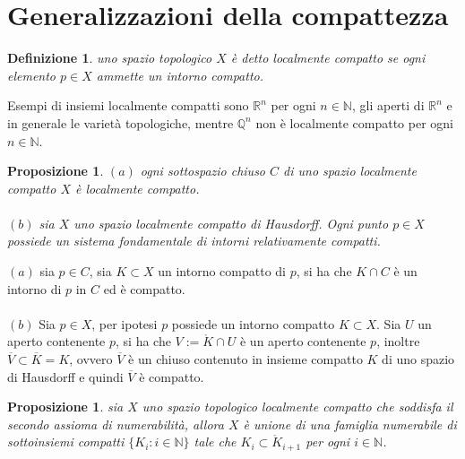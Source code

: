 \documentclass[oneside, 11pt]{amsbook}
\makeatletter
\newcommand{\0}{{(0)}}
\newcommand{\3}{{(3)}}
\theoremstyle{colonplain}
\newtheorem{prop}[thm]{Proposizione}
\theoremstyle{colondefinition}
\newtheorem{defn}[thm]{Definizione}
\theoremstyle{colonremark}
\numberwithin{equation}{chapter}
\renewcommand{\proofname}{Dimostrazione}
\renewenvironment{proof}[1][\proofname]{\par
  \pushQED{\qed}%
  \normalfont \topsep6\p@\@plus6\p@\relax
  \trivlist
  \item[\hskip\labelsep\bfseries #1:]\ignorespaces
}{%
  \popQED\endtrivlist\@endpefalse
}
\makeatother
\begin{document}
\section{Generalizzazioni della compattezza}
\begin{defn}
uno spazio topologico $X$ è detto \textit{localmente compatto} se ogni elemento $p \in X$ ammette un intorno compatto.
\end{defn}
Esempi di insiemi localmente compatti sono $\mathbb{R}^n$ per ogni $n \in \mathbb{N}$, gli aperti di $\mathbb{R}^n$ e in generale le varietà topologiche, mentre $\mathbb{Q}^n$ non è localmente compatto per ogni $n \in \mathbb{N}$.
\begin{prop}
$(a)$ ogni sottospazio chiuso $C$ di uno spazio localmente compatto $X$ è localmente compatto. \\ \\
$(b)$ sia $X$ uno spazio localmente compatto di Hausdorff. Ogni punto $p \in X$ possiede un sistema fondamentale di intorni relativamente compatti.
\end{prop}
\begin{proof}
$(a)$ sia $p \in C$, sia $K \subset X$ un intorno compatto di $p$, si ha che $K \cap C$ è un intorno di $p$ in $C$ ed è compatto. \\ \\
$(b)$ Sia $p \in X$, per ipotesi $p$ possiede un intorno compatto $K \subset X$. Sia $U$ un aperto contenente $p$, si ha che $V := \mathring{K} \cap U$ è un aperto contenente $p$, inoltre $\overline{V} \subset \overline{K} = K$, ovvero $\overline{V}$ è un chiuso contenuto in insieme compatto $K$ di uno spazio di Hausdorff e quindi $\overline{V}$ è compatto.
\end{proof}
\begin{prop}\label{ExhaustionCompacts}
sia $X$ uno spazio topologico localmente compatto che soddisfa il secondo assioma di numerabilità, allora $X$ è unione di una famiglia numerabile di sottoinsiemi compatti $\{K_i : i \in \mathbb{N}\}$ tale che $K_i \subset \mathring{K}_{i + 1}$ per ogni $i \in \mathbb{N}$.
\end{prop}
\end{document}
